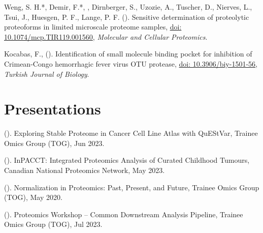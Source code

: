 \documentclass[line]{resonancecv}
\begin{document}
\begin{resume}
\begin{publist}
\item Weng, S. H.*, Demir, F.*, , Dirnberger, S., Uzozie, A., Tuscher, D., Nierves, L., Tsui, J., Huesgen, P. F., Lange, P. F. (). Sensitive determination of proteolytic proteoforms in limited microscale proteome samples, \href{https://doi.org/10.1074/mcp.TIR119.001560}{doi: 10.1074/mcp.TIR119.001560}, \emph{Molecular and Cellular Proteomics}.
\item Kocabas, F.,  (). Identification of small molecule binding pocket for inhibition of Crimean-Congo hemorrhagic fever virus OTU protease, \href{https://doi.org/10.3906/biy-1501-56}{doi: 10.3906/biy-1501-56}, \emph{Turkish Journal of Biology}.
\end{publist}

\section{Presentations}
\begin{publist}
\item {} (). Exploring Stable Proteome in Cancer Cell Line Atlas with QuEStVar, Trainee Omics Group (TOG), Jun 2023.
\item {} (). InPACCT: Integrated Proteomics Analysis of Curated Childhood Tumours, Canadian National Proteomics Network, May 2023.
\item {} (). Normalization in Proteomics: Past, Present, and Future, Trainee Omics Group (TOG), May 2020.
\end{publist}

\begin{publist}
\item {} (). Proteomics Workshop -- Common Downstream Analysis Pipeline, Trainee Omics Group (TOG), Jul 2023.
\end{publist}


\end{resume}
\end{document}
